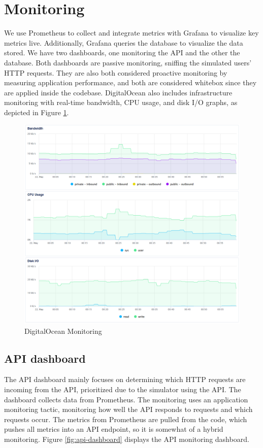 \documentclass[12pt, a4paper, oneside]{book}
\begin{document}
\section{Monitoring}
\label{sec:Monitoring}
We use Prometheus to collect and integrate metrics with Grafana to visualize key metrics live. Additionally, Grafana queries the database to visualize the data stored.
We have two dashboards, one monitoring the API and the other the database.
Both dashboards are passive monitoring, sniffing the simulated users' HTTP requests\cite{furnari2014}.
They are also both considered proactive monitoring by measuring application performance\cite{turnbull2015}, and both are considered whitebox\cite{turnbull2016} since they are applied inside the codebase.
DigitalOcean also includes infrastructure monitoring with real-time bandwidth, CPU usage, and disk I/O graphs, as depicted in Figure \ref{fig:do-monitoring}.

\begin{figure}[H]
    \centering
    \includegraphics[width=0.7\linewidth]{images/do-monitoring.png}
    \caption{DigitalOcean Monitoring}
    \label{fig:do-monitoring}
\end{figure}

\subsection{API dashboard}
The API dashboard mainly focuses on determining which HTTP requests are incoming from the API, prioritized due to the simulator using the API.
The dashboard collects data from Prometheus.
The monitoring uses an application monitoring tactic, monitoring how well the API responds to requests and which requests occur\cite{julian2018}.
The metrics from Prometheus are pulled from the code, which pushes all metrics into an API endpoint, so it is somewhat of a hybrid monitoring.
Figure \ref{fig:api-dashboard} displays the API monitoring dashboard.
\end{document}

